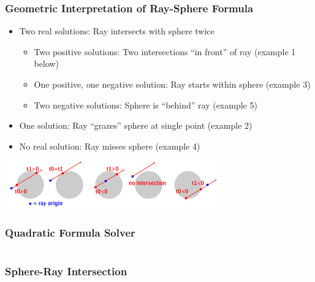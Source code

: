 \documentclass{beamer}
\begin{document}
\begin{frame}
	\frametitle{Geometric Interpretation of Ray-Sphere Formula}
	\begin{itemize}
		\item Two real solutions: Ray intersects with sphere twice
		\begin{itemize}
			\item Two positive solutions: Two intersections ``in front'' of ray (example 1 below)
			\item One positive, one negative solution: Ray starts within sphere (example 3)
			\item Two negative solutions: Sphere is ``behind'' ray (example 5)
		\end{itemize}
		\item One solution: Ray ``grazes'' sphere at single point (example 2)
		\item No real solution: Ray misses sphere (example 4)
	\end{itemize}
	\begin{center}
		\includegraphics[width=0.7\textwidth]{media/sphereIntersection.png}
	\end{center}
\end{frame}

\begin{frame}[fragile]
	\frametitle{Quadratic Formula Solver}
	\inputminted{python}{scripts/quadratic.py}
\end{frame}

\begin{frame}[fragile]
	\frametitle{Sphere-Ray Intersection}
	\inputminted{python}{scripts/sphereIntersection.py}
\end{frame}
\end{document}
